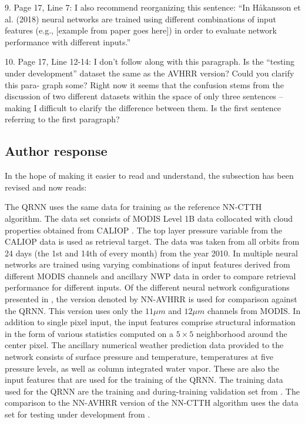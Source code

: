 \documentclass[journal abbreviation, manuscript]{copernicus}
\begin{document}
9.  Page 17, Line 7:  I also recommend reorganizing this sentence:  “In Håkansson et
al.  (2018) neural networks are trained using different combinations of input features
(e.g., [example from paper goes here]) in order to evaluate network performance with
different inputs.”


10. Page 17, Line 12-14: I don’t follow along with this paragraph. Is the “testing under
development” dataset the same as the AVHRR version?  Could you clarify this para-
graph some?  Right now it seems that the confusion stems from the discussion of two
different datasets within the space of only three sentences – making I difficult to clarify
the difference between them. Is the first sentence referring to the first paragraph?

\subsection*{Author response}

In the hope of making it easier to read and understand, the subsection has been
revised and now reads:

\vspace{0.5em}

\begin{em}
The QRNN uses the same data for training as the reference NN-CTTH algorithm. The
data set consists of MODIS Level 1B data \citep{myd021km, myd03} collocated with
cloud properties obtained from CALIOP \citep{calipso}. The top layer
  pressure variable from the CALIOP data is used as retrieval target. The data
was taken from all orbits from 24 days (the 1st and 14th of every month) from
the year 2010. In \citet{hakansson} multiple neural networks are trained using
varying combinations of input features derived from different MODIS channels and
ancillary NWP data in order to compare retrieval performance for different
inputs. Of the different neural network configurations presented in
\citet{hakansson}, the version denoted by NN-AVHRR is used for comparison
against the QRNN. This version uses only the $11 \unit{\mu m}$ and $12\unit{\mu
  m}$ channels from MODIS. In addition to single pixel input, the input features
comprise structural information in the form of various statistics computed on a
$5 \times 5$ neighborhood around the center pixel. The ancillary numerical weather
prediction data provided to the network consists of surface pressure and
temperature, temperatures at five pressure levels, as well as column integrated
water vapor. These are also the input features that are used for the training of
the QRNN. The training data used for the QRNN are the training and
during-training validation set from \citet{hakansson}. The comparison to
the NN-AVHRR version of the NN-CTTH algorithm uses the data set for
testing under development from \cite{hakansson}.
\end{em}
\end{document}
